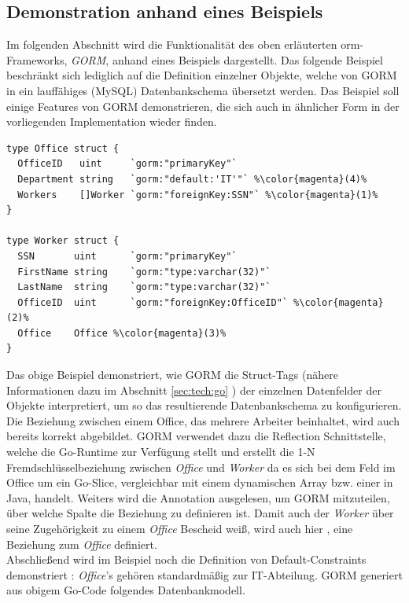 \subsection{Demonstration anhand eines Beispiels}
Im folgenden Abschnitt wird die Funktionalität des oben erläuterten \acrshort{orm}-Frameworks, \textit{GORM}, anhand eines Beispiels dargestellt. Das folgende Beispiel beschränkt sich lediglich auf die Definition einzelner Objekte, welche von GORM in ein lauffähiges (MySQL) Datenbankschema übersetzt werden. Das Beispiel soll einige Features von GORM demonstrieren, die sich auch in ähnlicher Form in der vorliegenden Implementation wieder finden.
\begin{lstlisting}[style=goMono,caption={GORM Demonstration anhand eines konkreten Beispiels},label={lst:tech:gorm:ex1}]
type Office struct {
  OfficeID   uint     `gorm:"primaryKey"`                    
  Department string   `gorm:"default:'IT'"` %\color{magenta}(4)%
  Workers    []Worker `gorm:"foreignKey:SSN"` %\color{magenta}(1)%
}

type Worker struct {
  SSN       uint      `gorm:"primaryKey"`     
  FirstName string    `gorm:"type:varchar(32)"` 
  LastName  string    `gorm:"type:varchar(32)"`
  OfficeID  uint      `gorm:"foreignKey:OfficeID"` %\color{magenta}(2)%
  Office    Office %\color{magenta}(3)%
}
\end{lstlisting}
Das obige Beispiel demonstriert, wie GORM die Struct-Tags (nähere Informationen dazu im Abschnitt \ref{sec:tech:go} ) der einzelnen Datenfelder der Objekte interpretiert, um so das resultierende Datenbankschema zu konfigurieren. 
Die Beziehung zwischen einem Office, das mehrere Arbeiter beinhaltet,  wird auch bereits korrekt abgebildet. GORM verwendet dazu die Reflection Schnittstelle, welche die Go-Runtime zur Verfügung stellt und erstellt die 1-N Fremdschlüsselbeziehung zwischen \textit{Office} und \textit{Worker} da es sich bei dem  Feld im Office um ein Go-Slice, vergleichbar mit einem dynamischen Array bzw. einer  in Java, handelt. Weiters wird die  Annotation ausgelesen, um GORM mitzuteilen, über welche Spalte die Beziehung zu definieren ist. Damit auch der \textit{Worker} über seine Zugehörigkeit zu einem \textit{Office} Bescheid weiß, wird auch hier ,  eine Beziehung zum \textit{Office} definiert.\\
Abschließend wird im Beispiel noch die Definition von Default-Constraints demonstriert : \textit{Office}'s gehören standardmäßig zur IT-Abteilung. GORM generiert aus obigem Go-Code folgendes Datenbankmodell.\bigskip
